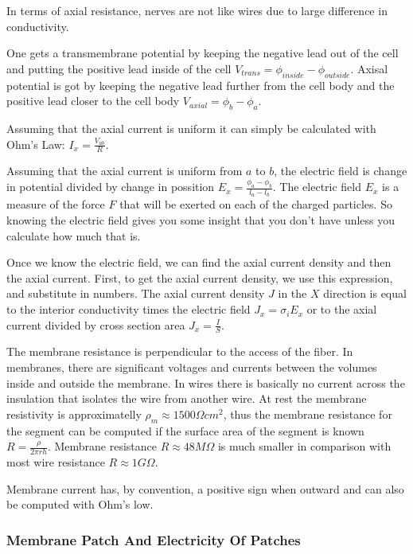\documentclass[14pt,a4paper]{scrartcl}
\begin{document}
In terms of axial resistance, nerves are not like wires due to large difference in conductivity. 

One gets a transmembrane potential by keeping the negative lead out of the cell and putting the positive lead inside of the cell $V_{trans} = \phi_{inside} - \phi_{outside}$. Axisal potential is got by keeping the negative lead further from the cell body and the positive lead closer to the cell body $V_{axial} = \phi_{b} - \phi_{a}$. 

Assuming that the axial current is uniform it can simply be calculated with Ohm's Law: $I_{x} = \frac{V_{ab}}{R}$.

Assuming that the axial current is uniform from $a$ to $b$, the electric field is change in potential divided by change in possition $E_{x} = \frac{\phi_{a}-\phi_{b}}{l_{a}-l_{b}}$. The electric field $E_{x}$ is a measure of the force $F$ that will be exerted on each of the charged particles. So knowing the electric field gives you some insight that you don't have unless you calculate how much that is.

Once we know the electric field, we can find the axial current density and then the axial current. First, to get the axial current density, we use this expression, and substitute in numbers. The axial current density $J$ in the $X$ direction is equal to the interior conductivity times the electric field $J_{x}=\sigma_{i}E_{x}$ or to the  axial current divided by cross section area $J_{x}=\frac{I}{S}$. 

The membrane resistance is perpendicular to the access of the fiber. In membranes, there are significant voltages and currents between the volumes inside and outside the membrane. In wires there is basically no current across the insulation that isolates the wire from another wire. At rest the membrane resistivity is approximatelly $\rho_{m} \approx 1500\Omega cm^{2}$, thus the membrane resistance for the segment can be computed if the surface area of the segment is known $R=\frac{\rho}{2 \pi r h}$. Membrane resistance $R \approx 48 M\Omega$ is much smaller in comparison with most wire resistance $R \approx 1 G\Omega$. 

Membrane current has, by convention, a positive sign when outward and can also be computed with Ohm's low. 

\subsubsection{Membrane Patch And Electricity Of Patches}
\label{sec:Hypothesis:Bioelectricity:Membrane Patch And Electricity Of Patches}
\end{document}

